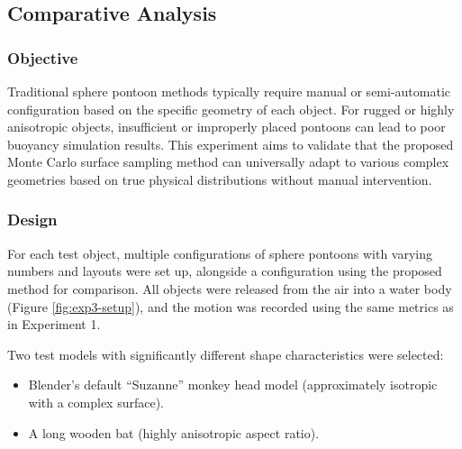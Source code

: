 \subsection*{Comparative Analysis}

\subsubsection*{Objective}

Traditional sphere pontoon methods typically require manual or semi-automatic configuration based on the specific geometry of each object. For rugged or highly anisotropic objects, insufficient or improperly placed pontoons can lead to poor buoyancy simulation results.  
This experiment aims to validate that the proposed Monte Carlo surface sampling method can universally adapt to various complex geometries based on true physical distributions without manual intervention.

\subsubsection*{Design}

For each test object, multiple configurations of sphere pontoons with varying numbers and layouts were set up, alongside a configuration using the proposed method for comparison. All objects were released from the air into a water body (Figure \ref{fig:exp3-setup}), and the motion was recorded using the same metrics as in Experiment 1.

Two test models with significantly different shape characteristics were selected:
\begin{itemize}
	\item Blender's default ``Suzanne'' monkey head model (approximately isotropic with a complex surface).
	\item A long wooden bat (highly anisotropic aspect ratio).
\end{itemize}

